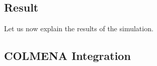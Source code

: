 \subsection{Result}

Let us now explain the results of the simulation.

\subsection{COLMENA Integration}